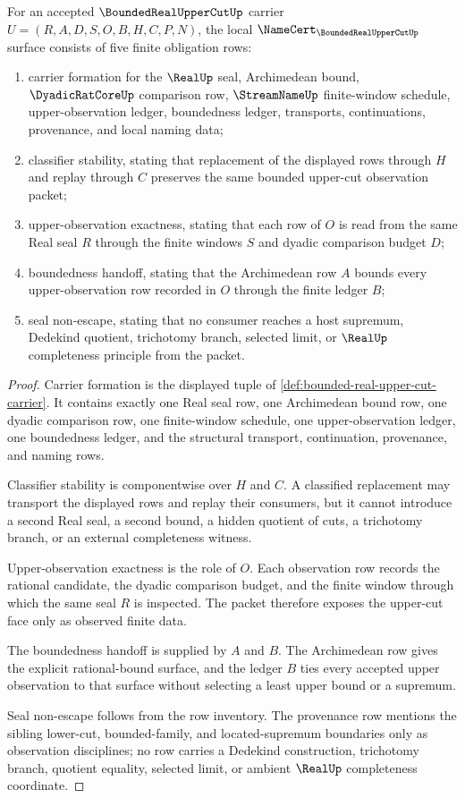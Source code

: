 \begin{theorem}
\label{thm:bounded-real-upper-cut-namecert-obligations}
For an accepted $\BoundedRealUpperCutUp$ carrier $U=(R,A,D,S,O,B,H,C,P,N)$, the local $\NameCert_{\BoundedRealUpperCutUp}$ surface consists of five finite obligation rows:
\begin{enumerate}
\item carrier formation for the $\RealUp$ seal, Archimedean bound, $\DyadicRatCoreUp$ comparison row, $\StreamNameUp$ finite-window schedule, upper-observation ledger, boundedness ledger, transports, continuations, provenance, and local naming data;
\item classifier stability, stating that replacement of the displayed rows through $H$ and replay through $C$ preserves the same bounded upper-cut observation packet;
\item upper-observation exactness, stating that each row of $O$ is read from the same Real seal $R$ through the finite windows $S$ and dyadic comparison budget $D$;
\item boundedness handoff, stating that the Archimedean row $A$ bounds every upper-observation row recorded in $O$ through the finite ledger $B$;
\item seal non-escape, stating that no consumer reaches a host supremum, Dedekind quotient, trichotomy branch, selected limit, or $\RealUp$ completeness principle from the packet.
\end{enumerate}
\end{theorem}
\begin{proof}
Carrier formation is the displayed tuple of \autoref{def:bounded-real-upper-cut-carrier}. It contains exactly one Real seal row, one Archimedean bound row, one dyadic comparison row, one finite-window schedule, one upper-observation ledger, one boundedness ledger, and the structural transport, continuation, provenance, and naming rows.

Classifier stability is componentwise over $H$ and $C$. A classified replacement may transport the displayed rows and replay their consumers, but it cannot introduce a second Real seal, a second bound, a hidden quotient of cuts, a trichotomy branch, or an external completeness witness.

Upper-observation exactness is the role of $O$. Each observation row records the rational candidate, the dyadic comparison budget, and the finite window through which the same seal $R$ is inspected. The packet therefore exposes the upper-cut face only as observed finite data.

The boundedness handoff is supplied by $A$ and $B$. The Archimedean row gives the explicit rational-bound surface, and the ledger $B$ ties every accepted upper observation to that surface without selecting a least upper bound or a supremum.

Seal non-escape follows from the row inventory. The provenance row mentions the sibling lower-cut, bounded-family, and located-supremum boundaries only as observation disciplines; no row carries a Dedekind construction, trichotomy branch, quotient equality, selected limit, or ambient $\RealUp$ completeness coordinate.
\end{proof}
